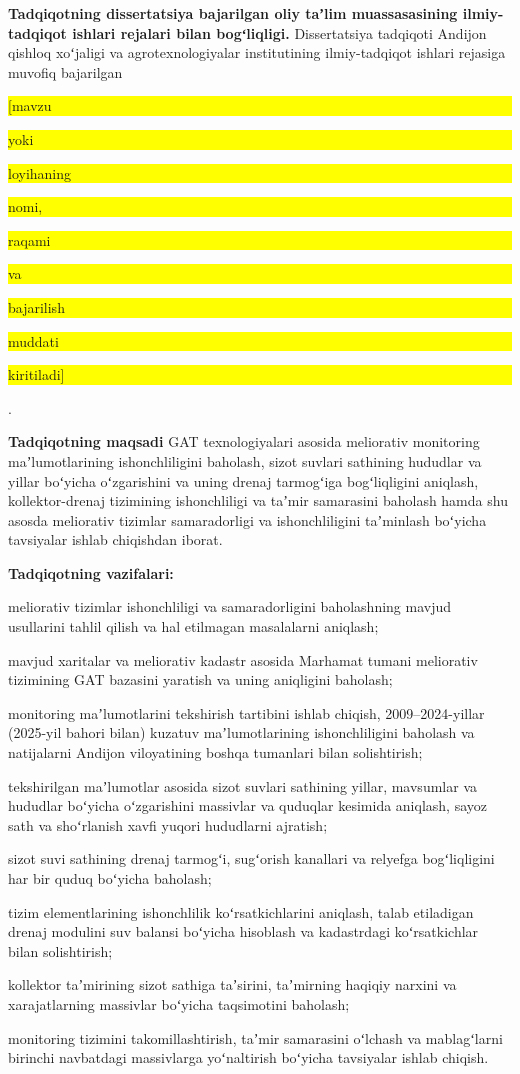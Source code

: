 \documentclass[14pt,a4paper,oneside]{extreport}
\newcommand{\toldir}[1]{\colorbox{yellow}{\strut #1}}
\begin{document}
\textbf{Tadqiqotning dissertatsiya bajarilgan oliy taʼlim muassasasining
ilmiy-tadqiqot ishlari rejalari bilan bogʻliqligi.} Dissertatsiya
tadqiqoti Andijon qishloq xoʻjaligi va agrotexnologiyalar institutining
ilmiy-tadqiqot ishlari rejasiga muvofiq bajarilgan \toldir{{[}mavzu}
\toldir{yoki} \toldir{loyihaning} \toldir{nomi,} \toldir{raqami}
\toldir{va} \toldir{bajarilish} \toldir{muddati} \toldir{kiritiladi{]}}.

\textbf{Tadqiqotning maqsadi} GAT texnologiyalari asosida meliorativ
monitoring maʼlumotlarining ishonchliligini baholash, sizot suvlari
sathining hududlar va yillar boʻyicha oʻzgarishini va uning drenaj
tarmogʻiga bogʻliqligini aniqlash, kollektor-drenaj tizimining
ishonchliligi va taʼmir samarasini baholash hamda shu asosda meliorativ
tizimlar samaradorligi va ishonchliligini taʼminlash boʻyicha tavsiyalar
ishlab chiqishdan iborat.

\textbf{Tadqiqotning vazifalari:}

meliorativ tizimlar ishonchliligi va samaradorligini baholashning mavjud
usullarini tahlil qilish va hal etilmagan masalalarni aniqlash;

mavjud xaritalar va meliorativ kadastr asosida Marhamat tumani
meliorativ tizimining GAT bazasini yaratish va uning aniqligini
baholash;

monitoring maʼlumotlarini tekshirish tartibini ishlab chiqish,
2009--2024-yillar (2025-yil bahori bilan) kuzatuv maʼlumotlarining
ishonchliligini baholash va natijalarni Andijon viloyatining boshqa
tumanlari bilan solishtirish;

tekshirilgan maʼlumotlar asosida sizot suvlari sathining yillar,
mavsumlar va hududlar boʻyicha oʻzgarishini massivlar va quduqlar
kesimida aniqlash, sayoz sath va shoʻrlanish xavfi yuqori hududlarni
ajratish;

sizot suvi sathining drenaj tarmogʻi, sugʻorish kanallari va relyefga
bogʻliqligini har bir quduq boʻyicha baholash;

tizim elementlarining ishonchlilik koʻrsatkichlarini aniqlash, talab
etiladigan drenaj modulini suv balansi boʻyicha hisoblash va kadastrdagi
koʻrsatkichlar bilan solishtirish;

kollektor taʼmirining sizot sathiga taʼsirini, taʼmirning haqiqiy
narxini va xarajatlarning massivlar boʻyicha taqsimotini baholash;

monitoring tizimini takomillashtirish, taʼmir samarasini oʻlchash va
mablagʻlarni birinchi navbatdagi massivlarga yoʻnaltirish boʻyicha
tavsiyalar ishlab chiqish.
\end{document}

